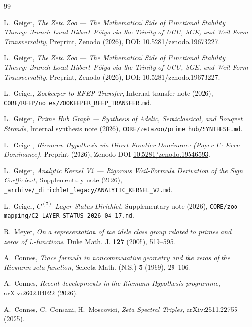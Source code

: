 \documentclass[11pt,a4paper]{article}
\theoremstyle{plain}
\theoremstyle{definition}
\begin{document}
\begin{thebibliography}{99}

L.~Geiger,
\textit{The Zeta Zoo --- The Mathematical Side of Functional
Stability Theory: Branch-Local Hilbert--P\'olya via the Trinity of
UCU, SGE, and Weil-Form Transversality},
Preprint, Zenodo (2026), DOI: 10.5281/zenodo.19673227.

L.~Geiger,
\textit{The Zeta Zoo --- The Mathematical Side of Functional
Stability Theory: Branch-Local Hilbert--P\'olya via the Trinity of
UCU, SGE, and Weil-Form Transversality},
Preprint, Zenodo (2026), DOI: 10.5281/zenodo.19673227.


L.~Geiger,
\textit{Zookeeper to RFEP Transfer},
Internal transfer note (2026),
  \texttt{CORE/RFEP/notes/ZOOKEEPER\_RFEP\_TRANSFER.md}.

L.~Geiger,
\textit{Prime Hub Graph --- Synthesis of Adelic, Semiclassical,
and Bouquet Strands},
Internal synthesis note (2026),
\texttt{CORE/zetazoo/prime\_hub/SYNTHESE.md}.

L.~Geiger,
\textit{Riemann Hypothesis via Direct Frontier Dominance
(Paper II: Even Dominance)},
Preprint (2026),
Zenodo DOI \href{https://doi.org/10.5281/zenodo.19546593}{10.5281/zenodo.19546593}.

L.~Geiger,
\textit{Analytic Kernel V2 --- Rigorous Weil-Formula Derivation
of the Sign Coefficient},
Supplementary note (2026),
\texttt{\_archive/\_dirichlet\_legacy/ANALYTIC\_KERNEL\_V2.md}.

L.~Geiger,
\textit{$C^{(2)}$-Layer Status Dirichlet},
Supplementary note (2026),
\texttt{CORE/zoo-mapping/C2\_LAYER\_STATUS\_2026-04-17.md}.

R.~Meyer,
\textit{On a representation of the idele class group related to
primes and zeros of $L$-functions},
Duke Math. J. \textbf{127} (2005), 519--595.

A.~Connes,
\textit{Trace formula in noncommutative geometry and the zeros of
the Riemann zeta function},
Selecta Math. (N.S.) \textbf{5} (1999), 29--106.

A.~Connes,
\textit{Recent developments in the Riemann Hypothesis programme},
arXiv:2602.04022 (2026).

A.~Connes, C.~Consani, H.~Moscovici,
\textit{Zeta Spectral Triples},
arXiv:2511.22755 (2025).


\end{thebibliography}
\end{document}
